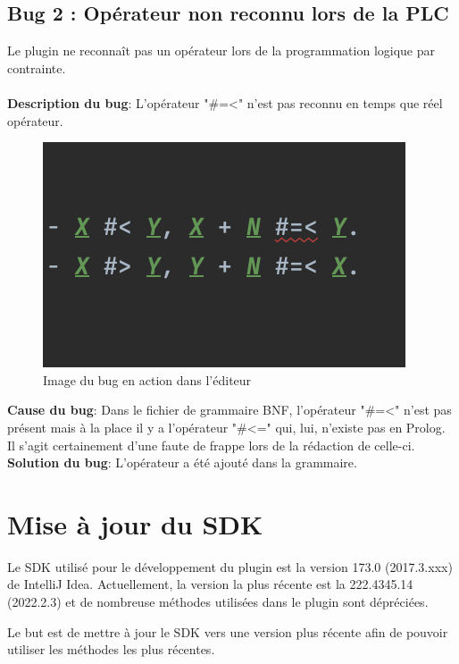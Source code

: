\subsection{Bug 2 : Opérateur non reconnu lors de la PLC}
\noindent Le plugin ne reconnaît pas un opérateur lors de la programmation logique par contrainte.
\\
\\
\textbf{Description du bug}: L'opérateur "\#=<" n'est pas reconnu en temps que réel opérateur.
\\
\begin{figure}
    \centering
    \includegraphics[scale=.85]{images/PLC_error.png}
    \caption{Image du bug en action dans l'éditeur}
    \label{fig:bug_2_plc_op}
\end{figure}

\noindent \textbf{Cause du bug}: Dans le fichier de grammaire BNF, l'opérateur "\#=<" n'est pas présent mais à la place il y a l'opérateur "\#<=" qui, lui, n'existe pas en Prolog.
Il s'agit certainement d'une faute de frappe lors de la rédaction de celle-ci.
\\
\textbf{Solution du bug}: L'opérateur a été ajouté dans la grammaire.

\section{Mise à jour du SDK}
\noindent
Le SDK utilisé pour le développement du plugin est la version 173.0 (2017.3.xxx) de IntelliJ Idea.
Actuellement, la version la plus récente est la 222.4345.14 (2022.2.3) et de nombreuse méthodes utilisées dans le plugin sont dépréciées.

Le but est de mettre à jour le SDK vers une version plus récente afin de pouvoir utiliser les méthodes les plus récentes.

